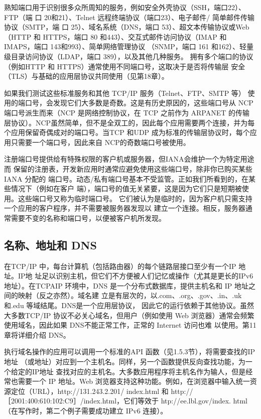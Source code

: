 熟知端口用于识别很多众所周知的服务，例如安全外壳协议（SSH，端口22）、FTP（端
口 20和21）、Telnet 远程终端协议（端口23）、电子邮件/ 简单邮件传输协议（SMTP，端
口 25）、域名系统（DNS，端口 53）、超文本传输协议或Web（HTTP 和 HTTPS，端口 80
和443）、交互式邮件访问协议（IMAP 和 IMAPS，端口 143和993）、简单网络管理协议
（SNMP，端口 161 和162）、轻量级目录访问协议（LDAP，端口 389），以及其他几种服务。
拥有多个端口的协议（例如HTTP 和 HTTPS）通常使用不同端口号，这取决于是否将传输层
安全（TLS）与基础的应用层协议共同使用（见第18章）。

\begin{tcolorbox}
    如果我们测试这些标准服务和其他 TCP/IP 服务（Telnet、FTP、SMTP 等）
    使用的端口号，会发现它们大多数是奇数。这是有历史原因的，这些端口号从
    NCP 端口号派生而来（NCP 是网络控制协议，在 TCP 之前作为 ARPANET 的传输
    层协议）。NCP虽然简单，但不是全双工的，因此每个应用需要两个连接，并为每
    个应用保留奇偶成对的端口号。当TCP 和UDP 成为标准的传输层协议时，每个应
    用只需要一个端口号，因此来自 NCP的奇数端口号被使用。
\end{tcolorbox}
注册端口号提供给有特殊权限的客户机或服务器，但IANA会维护一个为特定用途而
保留的注册表，开发新应用时通常应避免使用这些端口号，除非你已购买某些IANA 分配的
端口号。动态/私有端口号基本不受监管。正如我们所看到的，在某些情况下（例如在客户
端），端口号的值无关紧要，这是因为它们只是短期被使用。这些端口号又称为临时端口号。
它们被认为是临时的，因为客户机只需支持一个应用的客户程序，并不需要被服务器发现以
建立一个连接。相反，服务器通常需要不变的名称和端口号，以便被客户机所发现。

\subsection{名称、地址和 DNS}
在TCP/IP 中，每台计算机（包括路由器）的每个链路层接口至少有一个IP 地址。IP地
址足以识别主机，但它们不方便被人们记忆或操作（尤其是更长的IPv6地址）。在TCPAIP
环境中，DNS 是一个分布式数据库，提供主机名和 IP 地址之间的映射（反之亦然）。域名建
立是有层次的，以.com、.org、.gov、.in、.uk 和.edu 等域结尾。DNS是一个应用层协议，
因此它的运行依赖于其他协议。虽然大多数TCP/IP 协议不必关心域名，但用户（例如使用
Web 浏览器）通常会频繁使用域名，因此如果 DNS不能正常工作，正常的 Internet 访问也难
以使用。第11 章将详细介绍 DNS。

执行域名操作的应用可以调用一个标准的API 函数（见1.5.3节），将需要查找的IP地址
（或地址）对应到一个主机名。同样，另一个函数提供反向查找功能，为一个给定的IP地址
查找对应的主机名。大多数应用程序将主机名作为输人，但是经常也需要一个 IP 地址。Web
浏览器支持这种功能。例如，在浏览器中输入统一资源定位（URL），http://131.243.2.201/
index.html 和 http://［2001:400:610:102:C9］/index.html，它们等效于 htp://ee.lbl.gov/index.
html（在写作时，第二个例子需要成功建立 IPv6 连接）。

